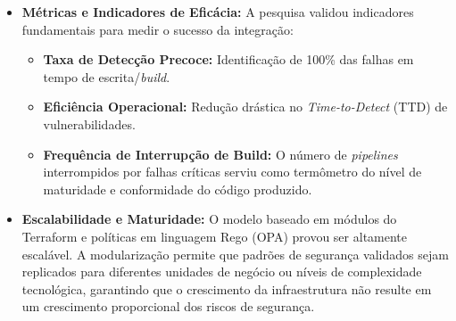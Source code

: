 \begin{itemize}
    \item \textbf{Métricas e Indicadores de Eficácia:}
    A pesquisa validou indicadores fundamentais para medir o sucesso da integração:
    \begin{itemize}
        \item \textbf{Taxa de Detecção Precoce:} Identificação de 100\% das falhas em tempo de escrita/\textit{build}.
        \item \textbf{Eficiência Operacional:} Redução drástica no \textit{Time-to-Detect} (TTD) de vulnerabilidades.
        \item \textbf{Frequência de Interrupção de Build:} O número de \textit{pipelines} interrompidos por falhas críticas serviu como termômetro do nível de maturidade e conformidade do código produzido.
    \end{itemize}

     \item\textbf{Escalabilidade e Maturidade:} O modelo baseado em módulos do Terraform e políticas em linguagem Rego (OPA) provou ser altamente escalável. A modularização permite que padrões de segurança validados sejam replicados para diferentes unidades de negócio ou níveis de complexidade tecnológica, garantindo que o crescimento da infraestrutura não resulte em um crescimento proporcional dos riscos de segurança.
\end{itemize}
